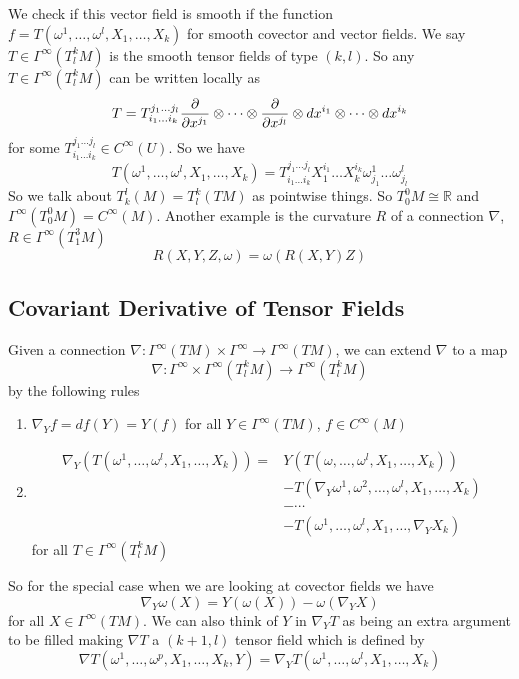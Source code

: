 \documentclass[a4paper]{article}
\begin{document}
We check if this vector field is smooth if the function $f = T(\omega^1, \dots, \omega^l, X_1, \dots, X_k)$ for smooth covector and vector fields. We say $T \in \Gamma^{\infty}(T_l^kM)$ is the smooth tensor fields of type $(k,l)$. So any $T \in \Gamma^{\infty}(T_l^kM)$ can be written locally as
\[
  T = T_{i_1 \dots i_k}^{j_1 \dots j_l} \pdv{x^{j_1} } \otimes \dots \otimes \pdv{x^{j_l}} \otimes dx^{i_1} \otimes \dots \otimes dx^{i_k} 
\]
for some $T_{i_1 \dots i_k}^{j_1 \dots j_l} \in C^{\infty}(U)$. So we have
\[
  T(\omega^1, \dots, \omega^l, X_{1}, \dots, X_k) = T_{i_1 \dots i_k}^{j_1 \dots j_l} X_1^{i_1} \dots X_k^{i_k} \omega_{j_1}^1 \dots \omega_{j_l}^l
\]
So we talk about $T_k^l(M) = T_l^k(TM)$ as pointwise things. So $T_0^0 M \cong \mathds{R}$ and $\Gamma^{\infty}(T_0^0M) = C^{\infty}(M)$. Another example is the curvature $R$ of a connection $\nabla$, $R \in \Gamma^{\infty}(T_1^3M)$
\[
  R(X,Y,Z,\omega) = \omega(R(X,Y)Z)
\]

\subsection*{Covariant Derivative of Tensor Fields}%
Given a connection $\nabla: \Gamma^{\infty}(TM) \times \Gamma^{\infty} \rightarrow \Gamma^{\infty}(TM)$, we can extend $\nabla$ to a map
\[
  \nabla: \Gamma^{\infty} \times \Gamma^\infty(T_l^k M) \rightarrow \Gamma^\infty (T_l^k M)
\]
by the following rules
\begin{enumerate}
  \item $\nabla_Y f = df(Y) = Y(f)$ for all $Y \in \Gamma^\infty (TM)$, $f \in C^\infty(M)$
  \item 
    \[
      \begin{aligned}
        \nabla_Y(T(\omega^1, \dots, \omega^l, X_1, \dots, X_k)) =&  Y(T(\omega, \dots, \omega^l, X_1, \dots, X_k)) \\
      &- T(\nabla_Y \omega^1, \omega^2, \dots, \omega^l, X_1, \dots, X_k) \\ 
      &- \cdots \\
      &- T(\omega^1, \dots, \omega^l, X_1, \dots, \nabla_Y X_k)
      \end{aligned}
  \]
  for all $T \in \Gamma^\infty(T_l^k M)$
\end{enumerate}
So for the special case when we are looking at covector fields we have
\[
  \nabla_Y \omega(X) = Y(\omega(X)) - \omega(\nabla_Y X)
\]
for all $X \in \Gamma^\infty(TM)$. We can also think of $Y$ in $\nabla_Y T$ as being an extra argument to be filled making $\nabla T$ a $(k+1, l)$ tensor field which is defined by
\[
  \nabla T(\omega^1, \dots, \omega^p, X_1, \dots, X_k, Y) = \nabla_Y T(\omega^1, \dots, \omega^l, X_1, \dots, X_k)
\]
\end{document}
